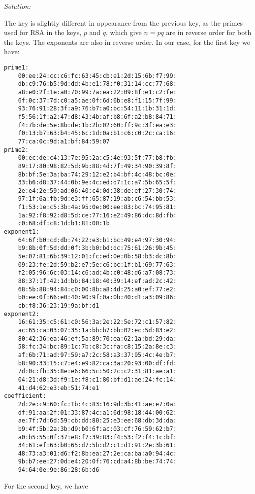 \documentclass[a4paper,11pt]{article}
\newenvironment{solution}%
{\par{\noindent\small\textit{Solution:}}\vspace{-12pt}\begin{framed}}%
{\end{framed}\par}
\begin{document}
\begin{solution}
The key is slightly different in appearance from the previous key, as the primes used for RSA in the keys, $p$ and $q$, which give $n = pq$ are in reverse order for both the keys. The exponents are also in reverse order. In our case, for the first key we have:
\begin{verbatim}
prime1:
    00:ee:24:cc:c6:fc:63:45:cb:e1:2d:15:6b:f7:99:
    db:c9:76:b5:9d:dd:4b:e1:78:f0:31:14:cc:77:68:
    a8:e0:2f:1e:a0:70:99:7a:ea:22:09:8f:e1:c2:fe:
    6f:0c:37:7d:c0:a5:ae:0f:6d:6b:e8:f1:15:7f:99:
    93:76:91:28:3f:a9:76:b7:a0:bc:54:11:1b:31:1d:
    f5:56:1f:a2:47:d8:43:4b:af:b8:6f:a2:b8:84:71:
    f4:7b:de:5e:8b:de:1b:2b:02:60:ff:9c:3f:ea:e3:
    f0:13:b7:63:b4:45:6c:1d:0a:b1:c6:c0:2c:ca:16:
    77:ca:0c:9d:a1:bf:84:59:07
prime2:
    00:ec:de:c4:13:7e:95:2a:c5:4e:93:5f:77:b8:fb:
    89:17:80:98:82:5d:9b:88:4d:7f:49:34:90:39:8f:
    8b:bf:5e:3a:ba:74:29:12:e2:b4:bf:4c:48:bc:0e:
    33:b6:d8:37:44:0b:9e:4c:ed:d7:1c:a7:5b:65:5f:
    2e:e4:2e:59:ad:06:40:c4:0d:38:de:ef:27:30:74:
    97:1f:6a:fb:9d:e3:ff:65:87:19:ab:c6:54:bb:53:
    f1:53:1e:c5:3b:4a:95:0e:00:ee:83:bc:74:95:81:
    1a:92:f8:92:d8:5d:ce:77:16:e2:49:86:dc:8d:fb:
    c0:68:df:c8:1d:b1:81:00:1b
exponent1:
    64:6f:b0:cd:db:74:22:e3:b1:bc:49:e4:97:30:94:
    b9:8b:0f:5d:dd:0f:3b:b0:bd:dc:75:61:26:9b:45:
    5e:07:81:6b:39:12:01:fc:ed:0e:0b:58:b3:dc:8b:
    09:23:fe:2d:59:b2:e7:5e:c6:bc:1f:b1:69:77:63:
    f2:05:96:6c:03:14:c6:ad:4b:c0:48:d6:a7:08:73:
    88:37:1f:42:1d:bb:84:18:40:39:14:ef:ad:2c:42:
    68:5b:88:94:84:c0:00:8b:a8:4d:25:a0:ef:77:e2:
    b0:ee:0f:66:e0:40:90:9f:0a:0b:40:d1:a3:09:86:
    cb:f8:36:23:19:9a:bf:d1
exponent2:
    16:61:35:c5:61:c0:56:3a:2e:22:5e:72:c1:57:82:
    ac:65:ca:03:07:35:1a:bb:b7:bb:02:ec:5d:83:e2:
    80:42:36:ea:46:ef:5a:89:70:ea:62:1a:bd:29:da:
    58:fc:34:bc:89:1c:7b:c8:3c:fa:c8:15:2a:8e:c3:
    af:6b:71:ad:97:59:a7:2c:58:a3:37:95:4c:4e:b7:
    b8:90:33:15:c7:e4:e9:82:ca:3a:20:93:00:df:fd:
    7d:0c:fb:35:8e:e6:66:5c:50:2c:c2:31:81:ae:a1:
    04:21:d8:3d:f9:1e:f8:c1:80:bf:d1:ae:24:fc:14:
    41:d4:62:e3:eb:51:74:e1
coefficient:
    2d:2e:c9:60:fc:1b:4c:83:16:9d:3b:41:ae:e7:0a:
    df:91:aa:2f:01:33:87:4c:a1:6d:98:18:44:00:62:
    ae:7f:7d:6d:59:cb:dd:80:25:e3:ee:68:db:3d:da:
    b9:4f:5b:2a:3b:d9:b0:6f:ac:03:cf:76:59:62:b7:
    a0:b5:55:0f:37:e8:f7:39:83:f4:53:f2:f4:1c:bf:
    34:61:ef:63:b0:65:d7:5b:d2:c1:d1:91:2e:3b:61:
    48:73:a3:01:d6:f2:8b:ea:27:2e:ca:ba:a0:94:4c:
    9b:b7:ee:27:0d:e4:20:0f:76:cd:a4:8b:be:74:74:
    94:64:0e:9e:86:28:6b:d6
\end{verbatim}
For the second key, we have 
\begin{verbatim}

\end{verbatim}
\end{solution}
\end{document}
